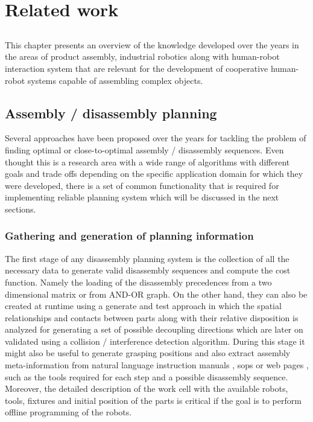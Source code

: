 \chapter{Related work}\label{chap:related-work}

\section*{}

This chapter presents an overview of the knowledge developed over the years in the areas of product assembly, industrial robotics along with human-robot interaction system that are relevant for the development of cooperative human-robot systems capable of assembling complex objects.



\section{Assembly / disassembly planning}

Several approaches have been proposed over the years for tackling the problem of finding optimal or close-to-optimal assembly / disassembly sequences. Even thought this is a research area with a wide range of algorithms with different goals and trade offs depending on the specific application domain for which they were developed, there is a set of common functionality that is required for implementing reliable planning system which will be discussed in the next sections.


\subsection{Gathering and generation of planning information}

The first stage of any disassembly planning system \cite{Whitney2004} is the collection of all the necessary data to generate valid disassembly sequences and compute the cost function. Namely the loading of the disassembly precedences from a two dimensional matrix or from AND-OR graph. On the other hand, they can also be created \cite{Pintzos2016} at runtime using a generate and test approach \cite{Kaufman1996,Halperin2000} in which the spatial relationships and contacts between parts \cite{Tang2008} along with their relative disposition is analyzed for generating a set of possible decoupling directions which are later on validated using a collision / interference detection algorithm. During this stage it might also be useful to generate grasping positions \cite{Thomas2015} and also extract assembly meta-information from natural language instruction manuals \cite{CostaICARSC2017}, \glspl{sop} \cite{Stenmark2013} or web pages \cite{Tenorth2010}, such as the tools required for each step and a possible disassembly sequence. Moreover, the detailed description of the work cell \cite{Thomas2001} with the available robots, tools, fixtures and initial position of the parts is critical if the goal is to perform offline programming of the robots.


